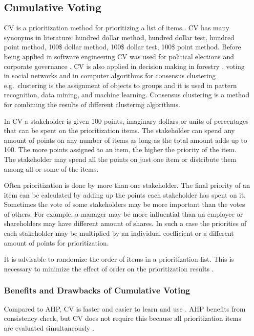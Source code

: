 

\subsection{Cumulative Voting\label{app:CV}}

CV is a prioritization method for prioritizing a list of items \citep{Leffingwell1999}.
CV has many synonyms in literature: hundred dollar method, hundred
dollar test, hundred point method, 100\$ dollar method, 100\$ dollar
test, 100\$ point method.
Before being applied in software engineering CV was used for
political elections \citep{Engstrom1999} and corporate governance
\citep{Bhagat1984}. CV is also applied in decision making in forestry
\citep{Hiltunen2008}, voting in social networks \citep{Boldi:2009:VSN:1645953.1646052} and in computer algorithms for consensus clustering \citep{Ayad2008b} e.g.\ clustering is the assignment of objects to groups and it is used in pattern recognition, data mining, and machine learning. Consensus clustering is a method for combining the results of different clustering algorithms.

In CV a stakeholder is given 100 points,
imaginary dollars or units of percentages that can be spent on the prioritization
items. The stakeholder can spend any amount of points on any number
of items as long as the total amount adds up to 100. The more points
assigned to an item, the higher the priority of the item. The
stakeholder may spend all the points on just one item or distribute
them among all or some of the items.

Often prioritization is done by more than one stakeholder. The final
priority of an item can be calculated by adding up the points each stakeholder
has spent on it. Sometimes the vote of some stakeholders may be more
important than the votes of others. For example, a manager may be
more influential than an employee or shareholders may have different
amount of shares. In such a case the priorities of each stakeholder
may be multiplied by an individual coefficient or a different amount of 
points for prioritization.

It is advisable to randomize the order of items in a prioritization
list. This is necessary to minimize the effect of order on the prioritization
results \citep{Svahnberg2009}.

\subsubsection{Benefits and Drawbacks of Cumulative Voting}
Compared to AHP, CV is faster and easier to learn and use \citep{Berander2005,Ahl2005}.
AHP benefits from consistency check, but CV does not require this because
all prioritization items are evaluated simultaneously \citep{Ahl2005}.

